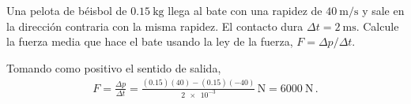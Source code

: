 
\begin{exercise}[ID=impulso, subtitle={Fuerza media del bate}, tags={banco}, points=25]
Una pelota de béisbol de $\qty{0.15}{\kilo\g}$ llega al bate con una rapidez de $\qty{40}{\m/\s}$ y sale en la dirección contraria con la misma rapidez. El contacto dura $\Delta t=\qty{2}{\milli\s}$. Calcule la fuerza media que hace el bate usando la ley de la fuerza, $F=\Delta p/\Delta t$.
\end{exercise}
\begin{solution}
Tomando como positivo el sentido de salida,
\begin{align}
    F = \frac{\Delta p}{\Delta t} = \frac{(0.15)(40)-(0.15)(-40)}{\num{2e-3}}\,\unit{\N} = \qty{6000}{\N}\,.
\end{align}
\end{solution}


